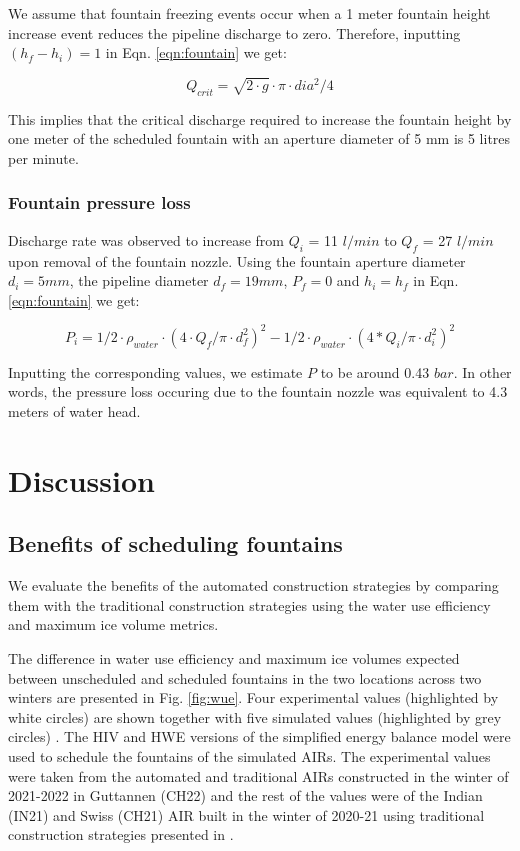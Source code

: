 \documentclass[tc, manuscript]{copernicus}
\begin{document}
We assume that fountain freezing events occur when a 1 meter fountain height increase event reduces the pipeline
discharge to zero. Therefore, inputting $(h_f - h_i) = 1$ in Eqn. \ref{eqn:fountain} we get: 

\begin{equation}
  \label{eqn:fountain_min}
  Q_{crit} = \sqrt{2 \cdot g } \cdot \pi \cdot dia^2/4
\end{equation}

This implies that the critical discharge required to increase the fountain height by one meter of the scheduled
fountain with an aperture diameter of 5 mm is 5 litres per minute.


\subsubsection{Fountain pressure loss}

Discharge rate was observed to increase from $Q_{i}$ = 11 $l/min$ to $Q_{f}$ = 27 $l/min$ upon removal of the
fountain nozzle. Using the fountain aperture diameter $d_i = 5 mm$, the pipeline diameter $d_f = 19 mm$, $P_{f}
= 0$ and $h_{i} = h_{f}$ in Eqn. \ref{eqn:fountain} we get: 

\begin{equation}
  P_{i} = 1/2 \cdot \rho_{water} \cdot (4 \cdot Q_f/\pi \cdot d_f^2)^2 - 1/2 \cdot \rho_{water} \cdot (4 * Q_i/\pi \cdot d_i^2)^2
\end{equation}

Inputting the corresponding values, we estimate $P$ to be around 0.43 $bar$. In other words, the pressure loss
occuring due to the fountain nozzle was equivalent to 4.3 meters of water head.

\section{Discussion}

\subsection{Benefits of scheduling fountains}

We evaluate the benefits of the automated construction strategies by comparing them with the traditional
construction strategies using the water use efficiency and maximum ice volume metrics. 

The difference in water use efficiency and maximum ice volumes expected between unscheduled and scheduled
fountains in the two locations across two winters are presented in Fig. \ref{fig:wue}. Four experimental values
(highlighted by white circles) are shown together with five simulated values (highlighted by grey circles) . The
HIV and HWE versions of the simplified energy balance model were used to schedule the fountains of the simulated
AIRs. The experimental values were taken from the automated and traditional AIRs constructed in the winter of
2021-2022 in Guttannen (CH22) and the rest of the values were of the Indian (IN21) and Swiss (CH21) AIR built in
the winter of 2020-21 using traditional construction strategies presented in
\cite{balasubramanianInfluenceMeteorologicalConditions2022}. 
\end{document}
